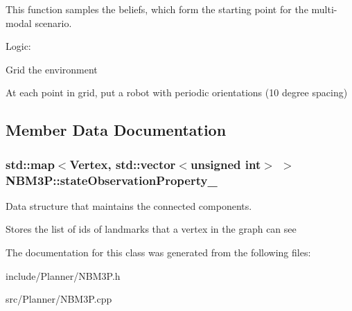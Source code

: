 This function samples the beliefs, which form the starting point for the multi-\/modal scenario. 

Logic\-:
\begin{DoxyEnumerate}
\item Grid the environment
\item At each point in grid, put a robot with periodic orientations (10 degree spacing)
\end{DoxyEnumerate}

\subsection{Member Data Documentation}
\hypertarget{class_n_b_m3_p_a3dc2afc2ddf851a7e31e0f3d6e21c6d9}{
\subsubsection[{state\-Observation\-Property\-\_\-}]{\setlength{\rightskip}{0pt plus 5cm}std\-::map$<$Vertex, std\-::vector$<$unsigned int$>$ $>$ N\-B\-M3\-P\-::state\-Observation\-Property\-\_\-\hspace{0.3cm}{\ttfamily [private]}}}\label{class_n_b_m3_p_a3dc2afc2ddf851a7e31e0f3d6e21c6d9}


Data structure that maintains the connected components. 

Stores the list of ids of landmarks that a vertex in the graph can see 

The documentation for this class was generated from the following files\-:\begin{DoxyCompactItemize}
\item 
include/\-Planner/N\-B\-M3\-P.\-h\item 
src/\-Planner/N\-B\-M3\-P.\-cpp\end{DoxyCompactItemize}
